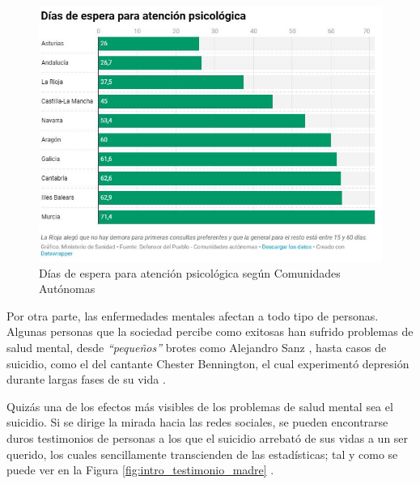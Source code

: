     \begin{figure}[h]
        \centering
        \includegraphics[width=0.75\linewidth]{figures/dias espera.JPG}
        \caption[Días de espera para atención psicológica según Comunidades Autónomas]{Días de espera para atención psicológica según Comunidades Autónomas \cite{asuar_gallego_recurrir_2021}}
        \label{fig:intro:dias_espera}
    \end{figure}

    Por otra parte, las enfermedades mentales afectan a todo tipo de personas. Algunas personas que la sociedad percibe como exitosas han sufrido problemas de salud mental, desde \textit{``pequeños''} brotes como Alejandro Sanz \cite{lopez_chicon_que_2023} \cite{riano_alejandro_2023}, hasta casos de suicidio, como el del cantante Chester Bennington, el cual experimentó depresión durante largas fases de su vida \cite{el_universal_nada_2020} \cite{gambin_historia_2022}.

    Quizás una de los efectos más visibles de los problemas de salud mental sea el suicidio. Si se dirige la mirada hacia las redes sociales, se pueden encontrarse duros testimonios de personas a los que el suicidio arrebató de sus vidas a un ser querido, los cuales sencillamente transcienden de las estadísticas; tal y como se puede ver en la Figura \ref{fig:intro_testimonio_madre} .
    
